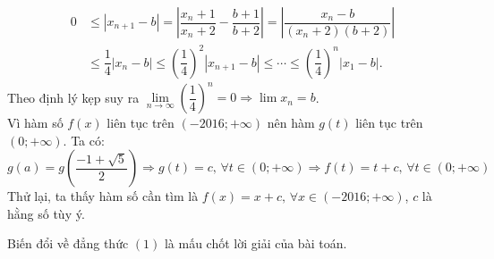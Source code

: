 \begin{bt}
{{\begin{align*}
		0&\le \left|x_{n+1}-b\right|=\left|\dfrac{x_n+1}{x_n+2}-\dfrac{b+1}{b+2}\right|=\left|\dfrac{x_n-b}{(x_n+2)(b+2)}\right|\\
		&\le \dfrac{1}{4}\left|x_n-b\right|\le \left(\dfrac{1}{4}\right)^2\left|x_{n+1}-b\right|\le \cdots \le \left(\dfrac{1}{4}\right)^n\left|x_1-b\right|.
		\end{align*}}Theo định lý kẹp suy ra $\lim\limits_{n\to \infty}\left(\dfrac{1}{4}\right)^n=0\Rightarrow \lim x_n=b$.\\
		Vì hàm số $f(x)$ liên tục trên $\left(-2016;+\infty\right)$ nên hàm $g(t)$ liên tục trên $\left(0;+\infty\right)$. Ta có:
		$$g(a)=g\left(\dfrac{-1+\sqrt{5}}{2}\right)\Rightarrow g(t)=c,\,\forall t\in(0;+\infty)\Rightarrow f(t)=t+c,\, \forall t\in (0;+\infty)$$
		Thử lại, ta thấy hàm số cần tìm là $f(x)=x+c,\, \forall x\in (-2016;+\infty)$, $c$ là hằng số tùy ý.
		\begin{nx}
			Biến đổi về đẳng thức $(1)$ là mấu chốt lời giải của bài toán.
		\end{nx}
	}
\end{bt}
